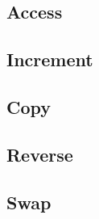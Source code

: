 \subsection{Access}

\subsection{Increment}

\subsection{Copy}

\subsection{Reverse}

\subsection{Swap}

